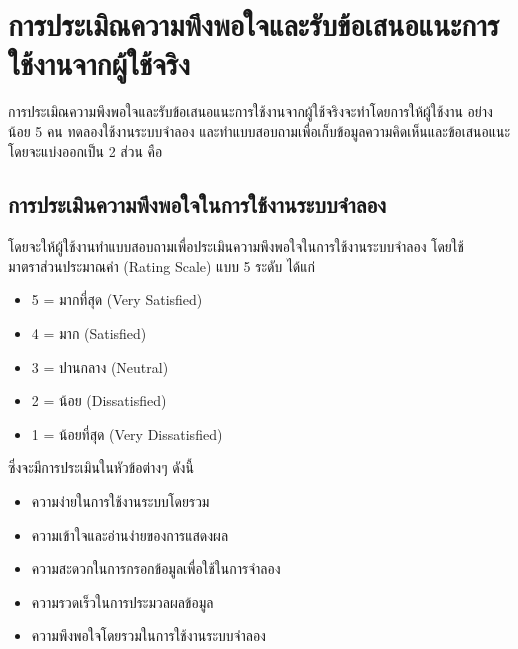\section{การประเมิณความพึงพอใจและรับข้อเสนอแนะการใช้งานจากผู้ใช้จริง}
\begin{mypara}
    \indent การประเมิณความพึงพอใจและรับข้อเสนอแนะการใช้งานจากผู้ใช้จริงจะทำโดยการให้ผู้ใช้งาน
    อย่างน้อย 5 คน ทดลองใช้งานระบบจำลอง และทำแบบสอบถามเพื่อเก็บข้อมูลความคิดเห็นและข้อเสนอแนะ
    โดยจะแบ่งออกเป็น 2 ส่วน คือ
    \subsection{การประเมินความพึงพอใจในการใช้งานระบบจำลอง}

        \begin{mypara}
            \indent โดยจะให้ผู้ใช้งานทำแบบสอบถามเพื่อประเมินความพึงพอใจในการใช้งานระบบจำลอง
            โดยใช้มาตราส่วนประมาณค่า (Rating Scale) แบบ 5 ระดับ ได้แก่
            \begin{itemize}
                \item 5 = มากที่สุด (Very Satisfied)
                \item 4 = มาก (Satisfied)
                \item 3 = ปานกลาง (Neutral)
                \item 2 = น้อย (Dissatisfied)
                \item 1 = น้อยที่สุด (Very Dissatisfied)
            \end{itemize}
            ซึ่งจะมีการประเมินในหัวข้อต่างๆ ดังนี้
            \begin{itemize}
                \item ความง่ายในการใช้งานระบบโดยรวม
                \item ความเข้าใจและอ่านง่ายของการแสดงผล
                \item ความสะดวกในการกรอกข้อมูลเพื่อใช้ในการจำลอง
                \item ความรวดเร็วในการประมวลผลข้อมูล
                \item ความพึงพอใจโดยรวมในการใช้งานระบบจำลอง
            \end{itemize}
        \end{mypara}


\end{mypara}
